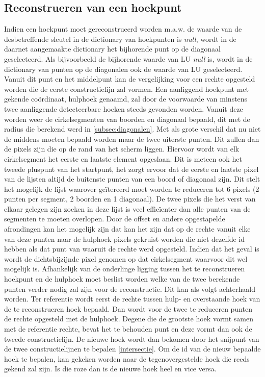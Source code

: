	\subsection{Reconstrueren van een hoekpunt}
		
		Indien een hoekpunt moet gereconstrueerd worden m.a.w. de waarde van de desbetreffende sleutel in de dictionary van hoekpunten is \textit{null}, wordt in de daarnet aangemaakte dictionary het bijhorende punt op de diagonaal geselecteerd. Als bijvoorbeeld de bijhorende waarde van LU \textit{null} is, wordt in de dictionary van punten op de diagonalen ook de waarde van LU geselecteerd.  Vanuit dit punt en het middelpunt kan de vergelijking voor een rechte opgesteld worden die de eerste constructielijn zal vormen. Een aanliggend hoekpunt met gekende coördinaat, hulphoek genaamd, zal door de voorwaarde van minstens twee aanliggende detecteerbare hoeken steeds gevonden worden. Vanuit deze worden weer de cirkelsegmenten van boorden en diagonaal bepaald, dit met de radius die berekend werd in \ref{subsec:diagonalen}. Met als grote verschil dat nu niet de middens moeten bepaald worden maar de twee uiterste punten. Dit zullen dan de pixels zijn die op de rand van het scherm liggen. Hiervoor wordt van elk cirkelsegment het eerste en laatste element opgeslaan. Dit is meteen ook het tweede pluspunt van het startpunt, het zorgt ervoor dat de eerste en laatste pixel van de lijsten altijd de buitenste punten van een boord of diagonaal zijn. Dit stelt het mogelijk de lijst waarover geïtereerd moet worden te reduceren tot 6 pixels (2 punten per segment, 2 boorden en 1 diagonaal). De twee pixels die het verst van elkaar gelegen zijn zoeken in deze lijst is veel efficïenter dan alle punten van de segmenten te moeten overlopen. Door de offset en andere opgestapelde afrondingen kan het mogelijk zijn dat  kan het zijn dat op de rechte vanuit elke van deze punten naar de hulphoek pixels gekruist worden die niet dezelfde id hebben als dat punt van waaruit de rechte werd opgesteld. Indien dat het geval is wordt de dichtsbijzijnde pixel genomen op dat cirkelsegment waarvoor dit wel mogelijk is. Afhankelijk van de onderlinge ligging tussen het te reconstrueren hoekpunt en de hulphoek moet beslist worden welke van de twee berekende punten verder nodig zal zijn voor de reconstructie. Dit kan als volgt achterhaald worden. Ter referentie wordt eerst de rechte tussen hulp- en overstaande hoek van de te reconstrueren hoek bepaald. Dan wordt voor de twee te reduceren punten de rechte opgesteld met de hulphoek. Degene die de grootste hoek vormt samen met de referentie rechte, bevat het te behouden punt en deze vormt dan ook de tweede constructielijn. De nieuwe hoek wordt dan bekomen door het snijpunt van de twee constructielijnen te bepalen \ref{intersectie}. Om de id van de nieuw bepaalde hoek te bepalen, kan gekeken worden naar de tegenovergestelde hoek die reeds gekend zal zijn. Is die roze dan is de nieuwe hoek heel en vice versa. 